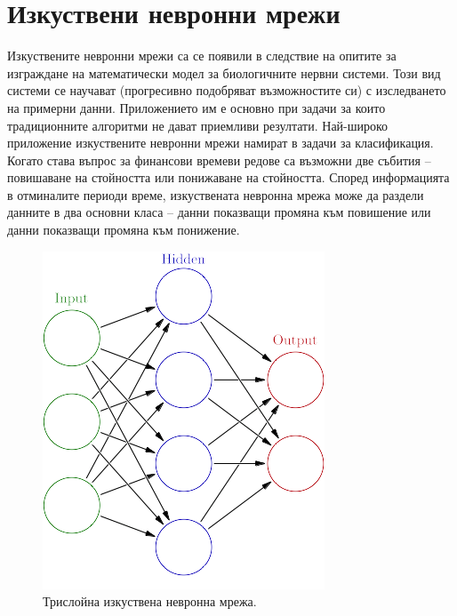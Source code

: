 \documentclass[book,14pt,oneside,openany]{memoir}
\begin{document}
\section{Изкуствени невронни мрежи}

Изкуствените невронни мрежи са се появили в следствие на опитите за изграждане на математически модел за биологичните нервни системи. Този вид системи се научават (прогресивно подобряват възможностите си) с изследването на примерни данни. Приложението им е основно при задачи за които традиционните алгоритми не дават приемливи резултати. Най-широко приложение изкуствените невронни мрежи намират в задачи за класификация. Когато става въпрос за финансови времеви редове са възможни две събития – повишаване на стойността или понижаване на стойността. Според информацията в отминалите периоди време, изкуствената невронна мрежа може да раздели данните в два основни класа – данни показващи промяна към повишение или данни показващи промяна към понижение. 

\begin{figure}[h]
  \centering
  \includegraphics[height=0.25\pdfpageheight]{./images/pic0004.png}
  \caption{Трислойна изкуствена невронна мрежа.}
\label{fig:pic0004}
\end{figure}
\end{document}
